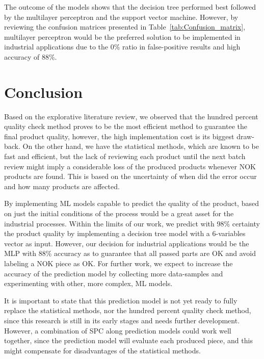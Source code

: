 \documentclass[5p,times,procedia]{elsarticle}
\begin{document}
The outcome of the models shows that the decision tree performed best followed by the multilayer perceptron and the support vector machine. However, by reviewing the confusion matrices presented in Table~\ref{tab:Confusion_matrix}, multilayer perceptron would be the preferred solution to be implemented in industrial applications due to the 0\% ratio in false-positive results and high accuracy of 88\%.

\section{Conclusion} \label{sec:conclusion}


Based on the explorative literature review, we observed that the hundred percent quality check method proves to be the most efficient method to guarantee the final product quality, however, the high implementation cost is its biggest draw-back. On the other hand, we have the statistical methods, which are known to be fast and efficient, but the lack of reviewing each product until the next batch review might imply a considerable loss of the produced products whenever NOK products are found. This is based on the uncertainty of when did the error occur and how many products are affected.

By implementing ML models capable to predict the quality of the product, based on just the initial conditions of the process would be a great asset for the industrial processes. Within the limits of our work, we predict with 98\% certainty the product quality by implementing a decision tree model with a 6-variables vector as input. 
However, our decision for industrial applications would be the MLP with 88\% accuracy as to guarantee that all passed parts are OK and avoid labeling a NOK piece as OK. For further work, we expect to increase the accuracy of the prediction model by collecting more data-samples and experimenting with other, more complex, ML models.

It is important to state that this prediction model is not yet ready to fully replace the statistical methods, nor the hundred percent quality check method, since this research is still in its early stages and needs further development. However, a combination of SPC along prediction models could work well together, since the prediction model will evaluate each produced piece, and this might compensate for disadvantages of the statistical methods.
\end{document}
